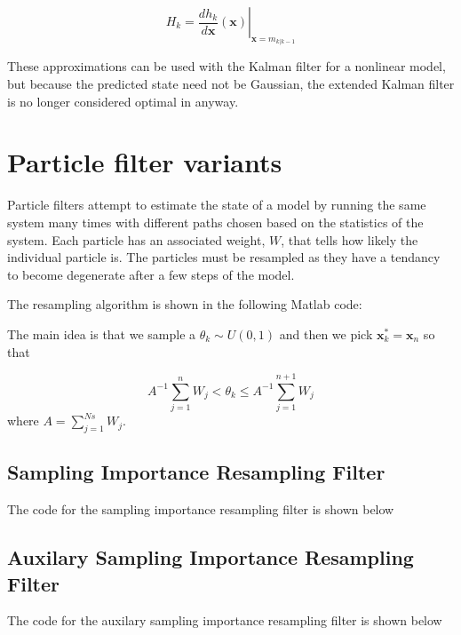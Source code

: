 \documentclass{article}
\begin{document}
\[ H_k = \left.\frac{dh_k}{d\mathbf{x}}(\mathbf{x})\right|_{\mathbf{x} = m_{k|k-1}} \]

These approximations can be used with the Kalman filter for a nonlinear 
model, but because the predicted state need not be Gaussian, the extended
Kalman filter is no longer considered optimal in anyway.

\section{Particle filter variants}

Particle filters attempt to estimate the state of a model by running the same
system many times with different paths chosen based on the statistics of the
system.  Each particle has an associated weight, $W$, that tells how likely the 
individual particle is.  The particles must be resampled as they have a
tendancy to become degenerate after a few steps of the model.

The resampling algorithm is shown in the following Matlab code:



The main idea is that we sample a $\theta_k \sim U(0,1)$ and then we pick
$\mathbf{x}_k^* = \mathbf{x}_n$ so that

\[A^{-1} \sum_{j=1}^{n}W_j < \theta_k \le A^{-1}\sum_{j=1}^{n+1} W_j\]
where $A = \sum_{j=1}^{Ns} W_j$.

\subsection{Sampling Importance Resampling Filter}

The code for the sampling importance resampling filter is shown below



\subsection{Auxilary Sampling Importance Resampling Filter}

The code for the auxilary sampling importance resampling filter is shown
below


\end{document}
